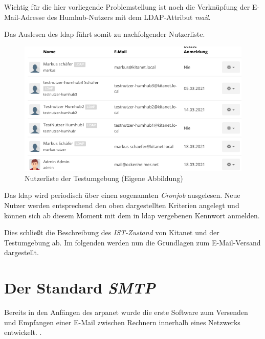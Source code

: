 Wichtig für die hier vorliegende Problemstellung ist noch die Verknüpfung der E-Mail-Adresse des Humhub-Nutzers mit dem LDAP-Attribut \textit{mail}. 

Das Auslesen des \ac{ldap} führt somit zu nachfolgender Nutzerliste.

\begin{figure}[h]
  \centering
  \includegraphics[width=1.0\textwidth]{res/nutzerliste.png}
  \caption{Nutzerliste der Testumgebung (Eigene Abbildung)}
  \label{fig:Nutzerliste}
\end{figure}

Das \ac{ldap} wird periodisch über einen sogenannten \textit{Cronjob} ausgelesen. Neue Nutzer werden entsprechend den oben dargestellten Kriterien angelegt und können sich ab diesem Moment mit dem in \ac{ldap} vergebenen Kennwort anmelden.

Dies schließt die Beschreibung des \textit{IST-Zustand} von Kitanet und der Testumgebung ab. Im folgenden werden nun die Grundlagen zum E-Mail-Versand dargestellt.

\chapter{Der Standard \textit{SMTP}}
\label{sec:Der Standard}
Bereits in den Anfängen des \ac{arpanet} wurde die erste Software zum Versenden und Empfangen einer E-Mail zwischen Rechnern innerhalb eines Netzwerks entwickelt.  \citep[][]{historyinternet}.

